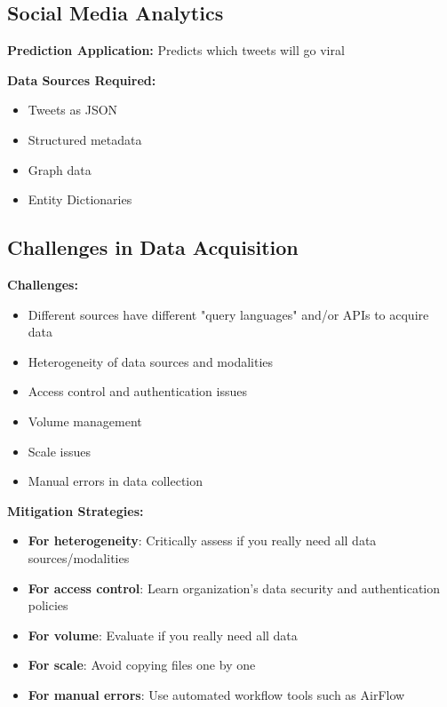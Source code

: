 \documentclass[12pt]{article}
\begin{document}
\subsection{Social Media Analytics}
\begin{tcolorbox}[colback=blue!5!white,colframe=blue!75!black,title={Example: Social Media Analytics}]
\textbf{Prediction Application:} Predicts which tweets will go viral

\textbf{Data Sources Required:}
\begin{itemize}
    \item Tweets as JSON
    \item Structured metadata
    \item Graph data
    \item Entity Dictionaries
\end{itemize}
\end{tcolorbox}

\subsection{Challenges in Data Acquisition}

\begin{tcolorbox}[colback=red!5!white,colframe=red!75!black,title={Acquisition Challenges and Mitigation Strategies}]
\textbf{Challenges:}
\begin{itemize}
    \item Different sources have different "query languages" and/or APIs to acquire data
    \item Heterogeneity of data sources and modalities
    \item Access control and authentication issues
    \item Volume management
    \item Scale issues
    \item Manual errors in data collection
\end{itemize}

\textbf{Mitigation Strategies:}
\begin{itemize}
    \item \textbf{For heterogeneity}: Critically assess if you really need all data sources/modalities
    \item \textbf{For access control}: Learn organization's data security and authentication policies
    \item \textbf{For volume}: Evaluate if you really need all data
    \item \textbf{For scale}: Avoid copying files one by one
    \item \textbf{For manual errors}: Use automated workflow tools such as AirFlow
\end{itemize}
\end{tcolorbox}
\end{document}
